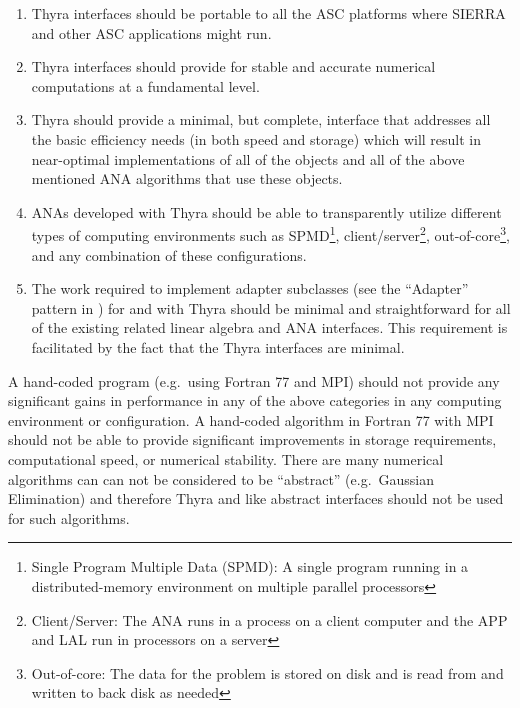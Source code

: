 \documentclass[pdf,ps2pdf,11pt]{SANDreport}
\begin{document}
\begin{enumerate}

{}\item Thyra interfaces should be portable to all the ASC
{}\cite{ref:doe_asci} platforms where SIERRA {}\cite{ref:SIERRA} and other ASC
applications might run.

{}\item Thyra interfaces should provide for stable and accurate numerical
computations at a fundamental level.

{}\item Thyra should provide a minimal, but complete, interface that addresses
all the basic efficiency needs (in both speed and storage) which will result
in near-optimal implementations of all of the objects and all of the above
mentioned ANA algorithms that use these objects.


{}\item ANAs developed with Thyra should be able to transparently utilize
different types of computing environments such as SPMD\footnote{Single Program
Multiple Data (SPMD): A single program running in a distributed-memory
environment on multiple parallel processors},
client/server\footnote{Client/Server: The ANA runs in a process on a client
computer and the APP and LAL run in processors on a server},
out-of-core\footnote{Out-of-core: The data for the problem is stored on disk
and is read from and written to back disk as needed}, and any combination of
these configurations.

{}\item The work required to implement adapter subclasses (see the ``Adapter''
pattern in {}\cite{ref:gama_et_al_1995}) for and with Thyra should be minimal
and straightforward for all of the existing related linear algebra and ANA
interfaces.  This requirement is facilitated by the fact that the Thyra
interfaces are minimal.

\end{enumerate}

A hand-coded program (e.g.~using Fortran 77 and MPI) should not provide any
significant gains in performance in any of the above categories in any
computing environment or configuration.  A hand-coded algorithm in Fortran 77
with MPI should not be able to provide significant improvements in storage
requirements, computational speed, or numerical stability.  There are many
numerical algorithms can can not be considered to be ``abstract'' (e.g.\
Gaussian Elimination) and therefore Thyra and like abstract interfaces should
not be used for such algorithms.
\end{document}
